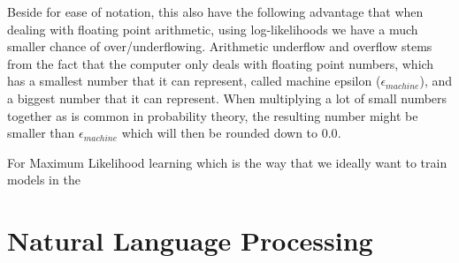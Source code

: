 Beside for ease of notation, this also have the following advantage that when
dealing with floating point arithmetic, using log-likelihoods we have a much
smaller chance of over/underflowing. Arithmetic underflow and overflow stems
from the fact that the computer only deals with floating point numbers, which
has a smallest number that it can represent, called machine epsilon
($\epsilon_{machine}$), and a biggest number that it can represent. When
multiplying a lot of small numbers together as is common in probability theory,
the resulting number might be smaller than $\epsilon_{machine}$ which will then
be rounded down to $0.0$.

For Maximum Likelihood learning which is the way that we ideally want to train
models in the 


\section{Natural Language Processing}
